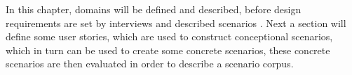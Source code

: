 In this chapter, domains will be defined and described, before design requirements are set by interviews and described scenarios 
. Next a section will define some user stories, which are used to construct conceptional scenarios, which in turn can be used to create some concrete scenarios, these concrete scenarios are then evaluated in order to describe a scenario corpus.